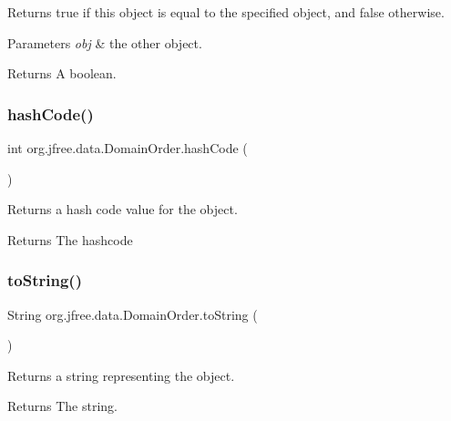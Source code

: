 Returns {\ttfamily true} if this object is equal to the specified object, and {\ttfamily false} otherwise.


\begin{DoxyParams}{Parameters}
{\em obj} & the other object.\\
\hline
\end{DoxyParams}
\begin{DoxyReturn}{Returns}
A boolean. 
\end{DoxyReturn}
\mbox{\label{classorg_1_1jfree_1_1data_1_1_domain_order_a14b1aaac4aa452f428b07a5bd6aed3c0}} 
\subsubsection{\texorpdfstring{hash\+Code()}{hashCode()}}
{\footnotesize\ttfamily int org.\+jfree.\+data.\+Domain\+Order.\+hash\+Code (\begin{DoxyParamCaption}{ }\end{DoxyParamCaption})}

Returns a hash code value for the object.

\begin{DoxyReturn}{Returns}
The hashcode 
\end{DoxyReturn}
\mbox{\label{classorg_1_1jfree_1_1data_1_1_domain_order_a5345f88cf5cfa9818f82364191644fd6}} 
\subsubsection{\texorpdfstring{to\+String()}{toString()}}
{\footnotesize\ttfamily String org.\+jfree.\+data.\+Domain\+Order.\+to\+String (\begin{DoxyParamCaption}{ }\end{DoxyParamCaption})}

Returns a string representing the object.

\begin{DoxyReturn}{Returns}
The string. 
\end{DoxyReturn}


